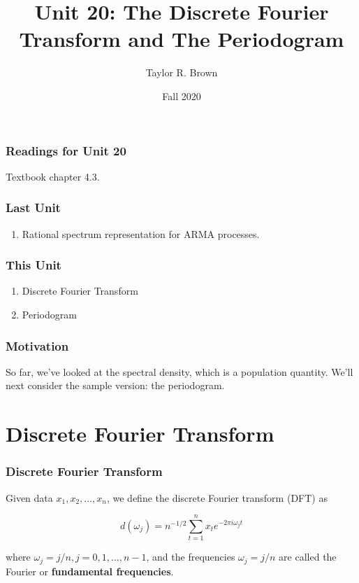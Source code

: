 \documentclass[%
xcolor=pdftex]{beamer}
\title{Unit 20: The Discrete Fourier Transform and The Periodogram}
\author[STAT 5170: Applied Time Series, Unit 20]{Taylor R. Brown}
\institute{Department of Statistics, University of Virginia}
\date{Fall 2020} %
\begin{document}
\frame{\titlepage}


\begin{frame}
\frametitle{Readings for Unit 20}

Textbook chapter 4.3.

\end{frame}



\begin{frame}
\frametitle{Last Unit}
\begin{enumerate}
\item Rational spectrum representation for ARMA processes.
\end{enumerate}
\end{frame}

\begin{frame}
\frametitle{This Unit}
\begin{enumerate}
\item Discrete Fourier Transform
\item Periodogram
\end{enumerate}
\end{frame}

\begin{frame}
\frametitle{Motivation}

So far, we've looked at the spectral density, which is a population quantity. We'll next consider the sample version: the periodogram.

\end{frame}

\section{Discrete Fourier Transform}
\frame{\tableofcontents[currentsection]}

\begin{frame}
\frametitle{Discrete Fourier Transform}

Given data $x_1,x_2,\ldots,x_n$, we define
the discrete Fourier transform (DFT) as

\begin{equation} \label{eq:DFT}
d(\omega_j)=n^{-1/2} \sum_{t=1}^n x_t e^{-2 \pi i \omega_j t}
\end{equation}

where $\omega_j= j/n, j=0,1,\ldots,n-1$, and the frequencies $\omega_j = j/n$ are called the Fourier or \textbf{fundamental frequencies}.
\end{frame}
\end{document}
